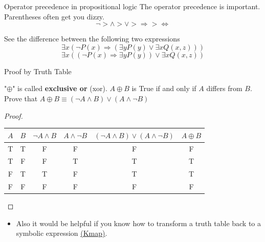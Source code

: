 \begin{frame}{Operator precedence in propositional logic}
    The operator precedence is important. Parentheses often get you dizzy.
    $$\neg > \wedge > \vee > \Rightarrow > \Leftrightarrow$$
    \begin{example}
        See the difference between the following two expressions
        $$\exists x\left(\neg P(x)\Rightarrow(\exists y P(y)\vee\exists xQ(x,z))\right)$$
        $$\exists x\left((\neg P(x)\Rightarrow\exists y P(y))\vee\exists xQ(x,z)\right)$$
    \end{example}
\end{frame}

\begin{frame}{Proof by Truth Table}
    \begin{example}
        "$\oplus$" is called \textbf{exclusive or} (xor). $A\oplus B$ is True if and only if $A$ differs from $B$. Prove that $A\oplus B\equiv (\neg A\wedge B)\vee (A\wedge \neg B)$
    \end{example}
    \mypause
    \begin{proof}
        \begin{table}[H]
            \centering
            \begin{tabular}{|c|c|c|c|c|c|}
                $A$ & $B$ & $\neg A\wedge B$ & $A\wedge \neg B$ & $(\neg A\wedge B)\vee (A\wedge \neg B)$ & $A\oplus B$\\\hline\hline
                T & T & F & F & F & F \\
                T & F & F & T & T & T \\
                F & T & T & F & T & T \\
                F & F & F & F & F & F
            \end{tabular}
        \end{table}
    \end{proof}
    \mypause
    \begin{itemize}
        \item Also it would be helpful if you know how to transform a truth table back to a symbolic expression \href{https://en.wikipedia.org/wiki/Karnaugh_map}{(Kmap)}.
    \end{itemize}
\end{frame}

